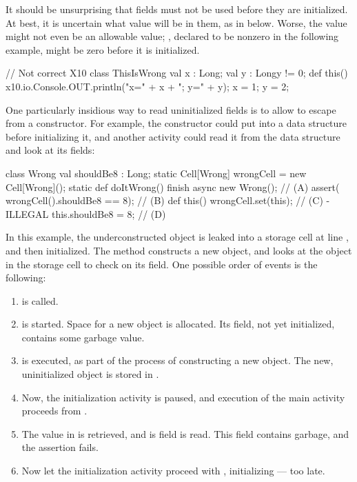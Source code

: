 It should be unsurprising that fields must not be used before they are
initialized. At best, it is uncertain what value will be in them, as in
 below. Worse, the value might not even be an allowable value; ,
declared to be nonzero in the following example, might be zero before it is
initialized.
\begin{xten}
// Not correct X10
class ThisIsWrong {
  val x : Long;
  val y : Long{y != 0};
  def this() {
    x10.io.Console.OUT.println("x=" + x + "; y=" + y);
    x = 1; y = 2;
  }
}
\end{xten}

One particularly insidious way to read uninitialized fields is to allow
 to escape from a constructor. For example, the constructor could
put  into a data structure before initializing it, and another
activity could read it from the data structure and look at its fields:
\begin{xten}
class Wrong {
  val shouldBe8 : Long;
  static Cell[Wrong] wrongCell = new Cell[Wrong]();
  static def doItWrong() {
     finish {
       async { new Wrong(); } // (A)
       assert( wrongCell().shouldBe8 == 8); // (B)
     }
  }
  def this() {
     wrongCell.set(this); // (C) - ILLEGAL
     this.shouldBe8 = 8; // (D)
  }
}
\end{xten}
\noindent
In this example, the underconstructed  object is leaked into a
storage cell at line , and then initialized.  The 
method constructs a new  object, and looks at the 
object in the storage cell to check on its  field.  One
possible order of events is the following:
\begin{enumerate}
\item {} is called.
\item {} is started.  Space for a new  object is allocated.
      Its  field, not yet initialized, contains some garbage
      value.
\item {} is executed, as part of the process of constructing a new
       object.  The new, uninitialized object is stored in
      .
\item Now, the initialization activity is paused, and execution of the main activity
      proceeds from .
\item The value in  is retrieved, and is  field
      is read.  This field contains garbage, and the assertion fails.
\item Now let the initialization activity proceed with ,
      initializing  --- too late.
\end{enumerate}

